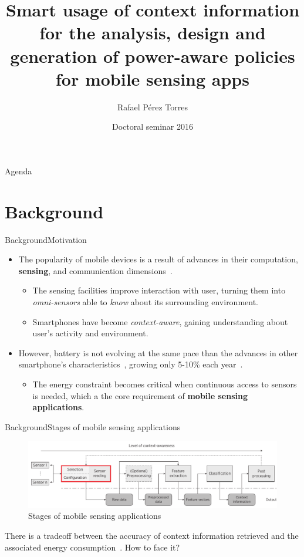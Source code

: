 \documentclass[10pt,xcolor={dvipsnames},handout]{beamer}
\title[Smart usage of context information for the analysis, design and generation of power-aware policies for MSA's]{Smart usage of context information for the analysis, design and generation of power-aware policies for mobile sensing apps}
\date{Doctoral seminar 2016}
\author{
  Rafael Pérez Torres
}
\institute[
  ITL Information Technology Laboratory\\
  Cinvestav\\
  Tamaulipas
] %
{%
  Dr. César Torres Huitzil\\
  Hiram Galeana Zapién, PhD\\

  LTI Cinvestav
  
}
\begin{document}
{\aauwavesbg%
\begin{frame} %
  \titlepage
\end{frame}}

\begin{frame}{Agenda}{}
\tableofcontents
\end{frame}

\section{Background}
\begin{frame}{Background}{Motivation}
\begin{itemize}
  \item<1-> The popularity of mobile devices is a result of advances in their computation, \textbf{sensing}, and communication dimensions~\cite{Islam2014}.
  \begin{itemize}
    \item<1-> The sensing facilities improve interaction with user, turning them into \emph{omni-sensors} able to \emph{know} about its surrounding environment.
    \item<2-> Smartphones have become \emph{context-aware}, gaining understanding about user's activity and environment.
  \end{itemize}
  \item<3-> However, battery is not evolving at the same pace than the advances in other smartphone's characteristics~\cite{Kjaergaard2012}, growing only 5-10\% each year~\cite{Ma2012,Evarts2015}.
  \begin{itemize}
    \item The energy constraint becomes critical when continuous access to sensors is needed, which a the core requirement of \textbf{mobile sensing applications}. 
  \end{itemize}
\end{itemize}
\end{frame}

\begin{frame}{Background}{Stages of mobile sensing applications}
\begin{figure}%
  \centering
  \includegraphics[width=\textwidth]{vectors/msa-stages}
  \caption{Stages of mobile sensing applications}
  \label{fig:msa-stages}
\end{figure}
There is a tradeoff between the accuracy of context information retrieved and the associated energy consumption~\cite{Sim2014,Rachuri2012}.
How to face it?
\end{frame}
\end{document}
